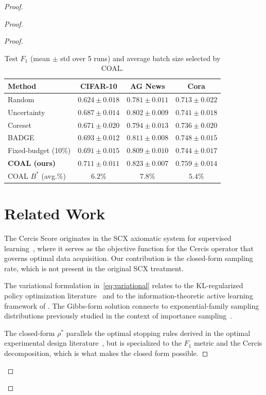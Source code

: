 \documentclass[12pt,a4paper]{article}
\begin{document}
\begin{proof}
\begin{proof}
\begin{proof}
\begin{table}[tb]
\centering
\caption{Test $F_1$ (mean $\pm$ std over 5 runs) and average batch size
         selected by COAL.}
\label{tab:results}
\begin{tabular}{@{}lccc@{}}
\toprule
\textbf{Method} & \textbf{CIFAR-10} & \textbf{AG News} & \textbf{Cora} \\
\midrule
Random          & $0.624\pm0.018$ & $0.781\pm0.011$ & $0.713\pm0.022$ \\
Uncertainty     & $0.687\pm0.014$ & $0.802\pm0.009$ & $0.741\pm0.018$ \\
Coreset         & $0.671\pm0.020$ & $0.794\pm0.013$ & $0.736\pm0.020$ \\
BADGE           & $0.693\pm0.012$ & $0.811\pm0.008$ & $0.748\pm0.015$ \\
Fixed-budget (10\%) & $0.691\pm0.015$ & $0.809\pm0.010$ & $0.744\pm0.017$ \\
\textbf{COAL (ours)} & $\mathbf{0.711\pm0.011}$ & $\mathbf{0.823\pm0.007}$ & $\mathbf{0.759\pm0.014}$ \\
\midrule
COAL $B^*$ (avg.\%) & $6.2\%$ & $7.8\%$ & $5.4\%$ \\
\bottomrule
\end{tabular}
\end{table}

\section{Related Work}

The Cercis Score originates in the \textsf{SCX} axiomatic system for supervised
learning~\citep{scx2024cercis}, where it serves as the objective function
for the Cercis operator that governs optimal data acquisition.  Our
contribution is the closed-form sampling rate, which is not present in the
original \textsf{SCX} treatment.

The variational formulation in~\eqref{eq:variational} relates to the
KL-regularized policy optimization literature~\citep{levine2018reinforcement}
and to the information-theoretic active learning framework of
\citet{houlsby2011bayesian}.  The Gibbs-form solution connects to
exponential-family sampling distributions previously studied in the context
of importance sampling~\citep{liu2016stein}.

The closed-form $\rho^*$ parallels the optimal stopping rules derived in the
optimal experimental design literature~\citep{pukelsheim2006optimal}, but is
specialized to the $F_1$ metric and the Cercis decomposition, which is what
makes the closed form possible.


\end{proof}
\end{proof}
\end{proof}
\end{document}
